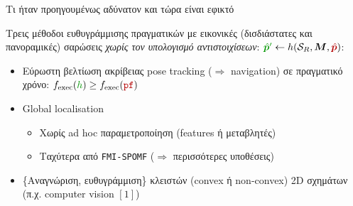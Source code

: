 \begin{frame}{Τι ήταν προηγουμένως αδύνατον και τώρα είναι εφικτό}


  \vspace{1cm}
  Τρεις μέθοδοι ευθυγράμμισης πραγματικών με εικονικές (δισδιάστατες και
  πανοραμικές) σαρώσεις \textit{χωρίς τον υπολογισμό αντιστοιχίσεων}:
  $\textcolor{g}{\hat{\bm{p}}^\prime} \leftarrow h(\mathcal{S}_R, \bm{M},
  \textcolor{r}{\hat{\bm{p}}})$:

  \begin{itemize}
    \item<2-> Εύρωστη βελτίωση ακρίβειας pose tracking ($\Rightarrow$ navigation) σε πραγματικό χρόνο:
      $f_{\text{exec}}(\textcolor{g}{h}) \geq f_{\text{exec}}(\texttt{\textcolor{r}{pf}})$
    \item<3-> Global localisation
      \begin{itemize}
        \item Χωρίς ad hoc παραμετροποίηση (features ή μεταβλητές)
        \item Ταχύτερα από \texttt{FMI-SPOMF} ($\Rightarrow$ περισσότερες υποθέσεις)
      \end{itemize}
    \item<4-> \{Αναγνώριση, ευθυγράμμιση\} κλειστών (convex ή non-convex) 2D σχημάτων
              (π.χ. computer vision $[1]$)
              \vspace{1.8cm}

  \end{itemize}



\end{frame}
